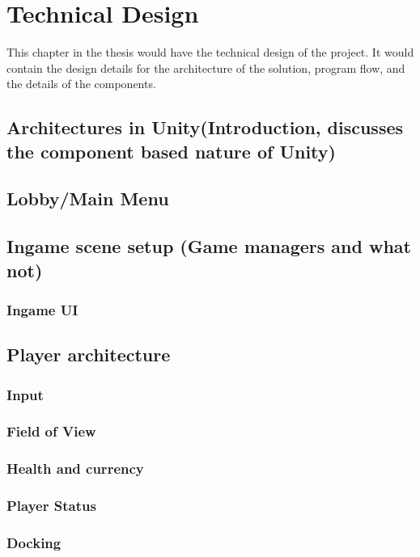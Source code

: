 \chapter{Technical Design}
\label{chap:technical}

This chapter in the thesis would have the technical design of the project.  It would contain the design details for the architecture of the solution, program flow, and the details of the components.

\section{Architectures in Unity(Introduction, discusses the component based nature of Unity)}

\section{Lobby/Main Menu}

\section{Ingame scene setup (Game managers and what not)}
\subsection{Ingame UI}

\section{Player architecture}
\subsection{Input}
\subsection{Field of View}
\subsection{Health and currency}
\subsection{Player Status}
\subsection{Docking}

